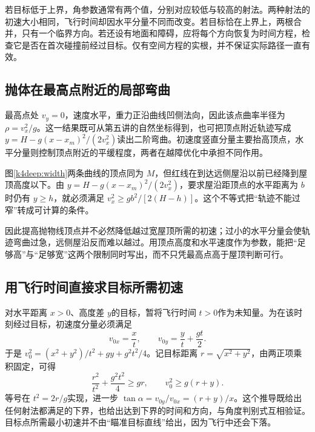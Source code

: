若目标低于上界，角参数通常有两个值，分别对应较低与较高的射法。两种射法的初速大小相同，飞行时间却因水平分量不同而改变。若目标恰在上界上，两根合并，只有一个临界方向。若还设有地面和障碍，应将每个方向恢复为时间方程，检查它是否在首次碰撞前经过目标。仅有空间方程的实根，并不保证实际路径一直有效。



\subsection{抛体在最高点附近的局部弯曲}
最高点处 $v_y=0$，速度水平，重力正沿曲线凹侧法向，因此该点曲率半径为 $\rho=v_x^2/g$。这一结果既可从第五讲的自然坐标得到，也可把顶点附近轨迹写成 $y=H-g(x-x_m)^2/(2v_x^2)$读出二阶弯曲。初速度竖直分量主要抬高顶点，水平分量则控制顶点附近的平缓程度，两者在越障优化中承担不同作用。

图\ref{k4deep:width}两条曲线的顶点同为 $M$，但红线在到达远侧屋沿以前已经降到屋顶高度以下。由 $y=H-g(x-x_m)^2/(2v_x^2)$，要求屋沿距顶点的水平距离为 $b$ 时仍有 $y\ge h$，就必须满足 $v_x^2\ge gb^2/[2(H-h)]$。这个不等式把“轨迹不能过窄”转成可计算的条件。

因此提高抛物线顶点并不必然降低越过宽屋顶所需的初速；过小的水平分量会使轨迹弯曲过急，远侧屋沿反而难以越过。用顶点高度和水平速度作为参数，能把“足够高”与“足够宽”这两个限制同时写出，而不只凭最高点高于屋顶判断可行。

\subsection{用飞行时间直接求目标所需初速}
对水平距离 $x>0$、高度差 $y$的目标，暂将飞行时间 $t>0$作为未知量。为在该时刻经过目标，初速度分量必须满足
\[v_{0x}=\frac{x}{t},\qquad v_{0y}=\frac yt+\frac{gt}{2}.
\]
于是 $v_0^2=(x^2+y^2)/t^2+gy+g^2t^2/4$。记目标距离 $r=\sqrt{x^2+y^2}$，由两正项乘积固定，可得
\[\frac{r^2}{t^2}+\frac{g^2t^2}{4}\ge gr,\qquad
v_0^2\ge g(r+y).
\]
等号在 $t^2=2r/g$实现，进一步 $\tan\alpha=v_{0y}/v_{0x}=(r+y)/x$。这个推导既给出任何射法都满足的下界，也给出达到下界的时间和方向，与角度判别式互相验证。目标点所需最小初速并不由“瞄准目标直线”给出，因为飞行中还会下落。

